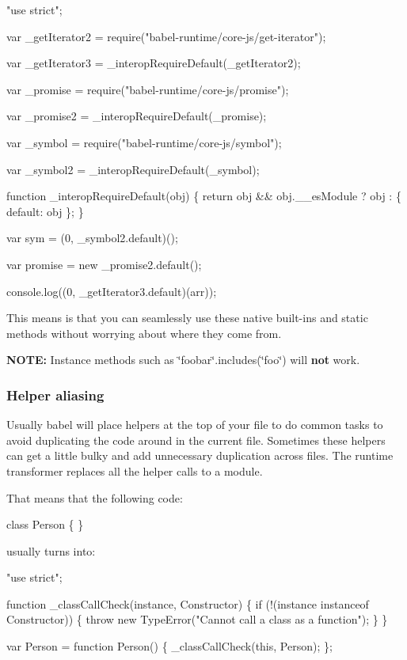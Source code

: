 \begin{DoxyCode}
"use strict";

var \_getIterator2 = require("babel-runtime/core-js/get-iterator");

var \_getIterator3 = \_interopRequireDefault(\_getIterator2);

var \_promise = require("babel-runtime/core-js/promise");

var \_promise2 = \_interopRequireDefault(\_promise);

var \_symbol = require("babel-runtime/core-js/symbol");

var \_symbol2 = \_interopRequireDefault(\_symbol);

function \_interopRequireDefault(obj) \{ return obj && obj.\_\_esModule ? obj : \{ default: obj \}; \}

var sym = (0, \_symbol2.default)();

var promise = new \_promise2.default();

console.log((0, \_getIterator3.default)(arr));
\end{DoxyCode}


This means is that you can seamlessly use these native built-\/ins and static methods without worrying about where they come from.

{\bfseries N\+O\+TE\+:} Instance methods such as {\ttfamily \char`\"{}foobar\char`\"{}.includes(\char`\"{}foo\char`\"{})} will {\bfseries not} work.

\subsubsection*{Helper aliasing}

Usually babel will place helpers at the top of your file to do common tasks to avoid duplicating the code around in the current file. Sometimes these helpers can get a little bulky and add unnecessary duplication across files. The {\ttfamily runtime} transformer replaces all the helper calls to a module.

That means that the following code\+:


\begin{DoxyCode}
class Person \{
\}
\end{DoxyCode}


usually turns into\+:


\begin{DoxyCode}
"use strict";

function \_classCallCheck(instance, Constructor) \{ if (!(instance instanceof Constructor)) \{ throw new
       TypeError("Cannot call a class as a function"); \} \}

var Person = function Person() \{
  \_classCallCheck(this, Person);
\};
\end{DoxyCode}


